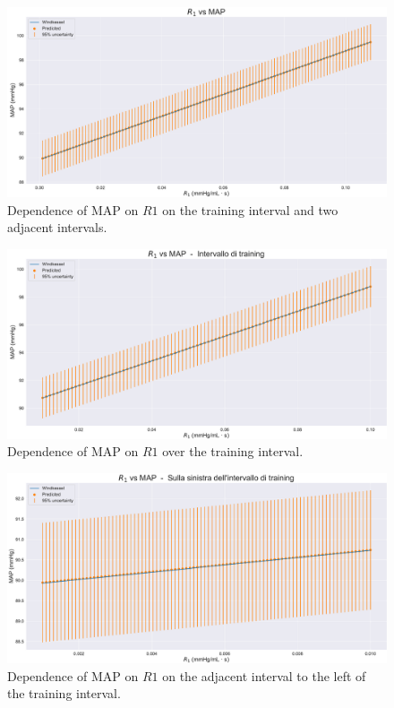 \begin{figure}[!htb]
    \centering
    \includegraphics[width=1\textwidth]{images/Training (risultati)/MAP/MAP - R1 - full.pdf}
    \caption{Dependence of MAP on $R1$ on the training interval and two adjacent intervals.}
    \label{MAP - R1 - full}
\end{figure}

\vspace{1cm}

\begin{figure}[!htb]
    \centering
    \includegraphics[width=1\textwidth]{images/Training (risultati)/MAP/MAP - R1 - training.pdf}
    \caption{Dependence of MAP on $R1$ over the training interval.}
    \label{MAP - R1 - training}
\end{figure}

\begin{figure}
    \centering
    \includegraphics[width=1\textwidth]{images/Training (risultati)/MAP/MAP - R1 - sx.pdf}
    \caption{Dependence of MAP on $R1$ on the adjacent interval to the left of the training interval.}
    \label{MAP - R1 - sx}
\end{figure}



